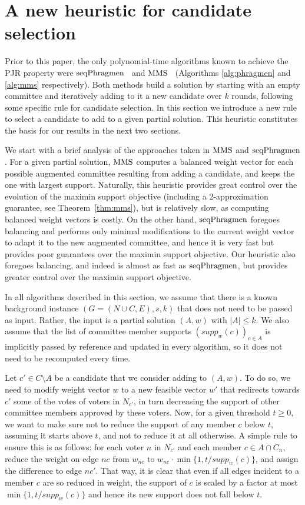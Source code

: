 \section{A new heuristic for candidate selection}\label{s:heuristic}

Prior to this paper, the only polynomial-time algorithms known to achieve the PJR property were $\operatorname{seqPhragmen}$~\cite{brill2017phragmen} and $\operatorname{MMS}$~\cite{sanchez2016maximin} (Algorithms \ref{alg:phragmen} and \ref{alg:mms} respectively). 
Both methods build a solution by starting with an empty committee and iteratively adding to it a new candidate over $k$ rounds, following some specific rule for candidate selection. 
In this section we introduce a new rule to select a candidate to add to a given partial solution. 
This heuristic constitutes the basis for our results in the next two sections. 

We start with a brief analysis of the approaches taken in $\operatorname{MMS}$ and $\operatorname{seqPhragmen}$. For a given partial solution, $\operatorname{MMS}$ computes a balanced weight vector for each possible augmented committee resulting from adding a candidate, and keeps the one with largest support. Naturally, this heuristic provides great control over the evolution of the maximin support objective (including a 2-approximation guarantee, see Theorem~\ref{thm:mms}), but is relatively slow, as computing balanced weight vectors is costly. On the other hand, $\operatorname{seqPhragmen}$ foregoes balancing and performs only minimal modifications to the current weight vector to adapt it to the new augmented committee, and hence it is very fast but provides poor guarantees over the maximin support objective. Our heuristic also foregoes balancing, and indeed is almost as fast as $\operatorname{seqPhragmen}$, but provides greater control over the maximin support objective.

In all algorithms described in this section, we assume that there is a known background instance $(G=(N\cup C, E), s, k)$ that does not need to be passed as input. Rather, the input is a partial solution $(A,w)$ with $|A|\leq k$. We also assume that the list of committee member supports $(supp_w(c))_{c\in A}$ is implicitly passed by reference and updated in every algorithm, so it does not need to be recomputed every time.

Let $c'\in C\setminus A$ be a candidate that we consider adding to $(A,w)$. To do so, we need to modify weight vector $w$ to a new feasible vector $w'$ that redirects towards $c'$ some of the votes of voters in $N_{c'}$, in turn decreasing the support of other committee members approved by these voters. Now, for a given threshold $t\geq 0$, we want to make sure not to reduce the support of any member $c$ below $t$, assuming it starts above $t$, and not to reduce it at all otherwise. A simple rule to ensure this is as follows: for each voter $n$ in $N_{c'}$ and each member $c\in A\cap C_n$, reduce the weight on edge $nc$ from $w_{nc}$ to $w_{nc}\cdot \min\{1, t/supp_w(c)\}$, and assign the difference to edge $nc'$. That way, it is clear that even if all edges incident to a member $c$ are so reduced in weight, the support of $c$ is scaled by a factor at most $\min\{1, t/supp_w(c)\}$ and hence its new support does not fall below $t$.

